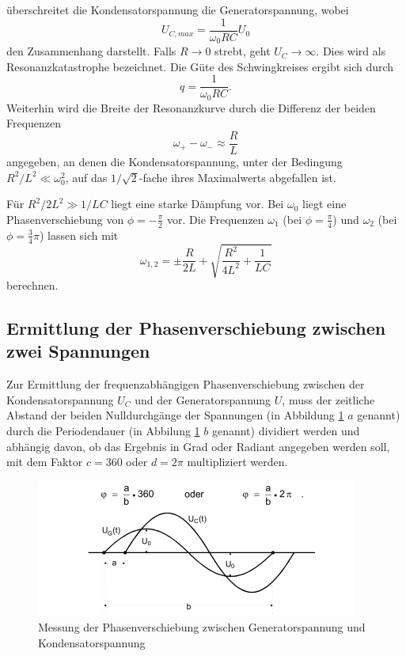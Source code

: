 \noindent 
überschreitet die Kondensatorspannung die Generatorspannung, wobei 
\begin{equation}
    U_{C,max} = \frac{1}{\omega_0 RC} U_0 
\end{equation}
\noindent
den Zusammenhang darstellt. Falls $R \rightarrow 0$ strebt, geht $U_C \rightarrow \infty$. Dies 
wird als Resonanzkatastrophe bezeichnet. Die Güte des Schwingkreises ergibt sich durch
\begin{equation}
    q = \frac{1}{\omega_0 RC}.
    \label{eq:b1}
\end{equation}
\noindent
Weiterhin wird die Breite der Resonanzkurve durch die Differenz der beiden Frequenzen 
\begin{equation}
    \omega_+ - \omega_- \approx \frac{R}{L}
\end{equation}
angegeben, an denen die Kondensatorspannung, unter der Bedingung 
$R^{2}/L^{2} \ll \omega_0^{2}$, auf das $1/\sqrt{2}$-fache
ihres Maximalwerts abgefallen ist.  

Für $R^{2}/2L^{2} \gg 1/LC$ liegt eine starke Dämpfung vor. Bei $\omega_0$ liegt
eine Phasenverschiebung von $\phi = -\frac{\pi}{2}$ vor. Die Frequenzen $\omega_1$ (bei $\phi = \frac{\pi}{4}$) und
$\omega_2$ (bei $\phi = \frac{3}{4}\pi$) lassen sich mit 
\begin{equation}
    \omega_{1,2} = \pm \frac{R}{2L} + \sqrt{\frac{R^{2}}{4L^{2}}+\frac{1}{LC}}
    \label{eq:bb}
\end{equation}
\noindent berechnen.


\subsection{Ermittlung der Phasenverschiebung zwischen zwei Spannungen}

Zur Ermittlung der frequenzabhängigen Phasenverschiebung zwischen der Kondensatorspannung $U_C$ 
und der Generatorspannung $U$, muss der zeitliche Abstand der beiden Nulldurchgänge der Spannungen 
(in Abbildung \ref{fig:phase} $a$ genannt) durch die Periodendauer (in Abbilung \ref{fig:phase} $b$ genannt)
dividiert werden und abhängig davon, ob das Ergebnis in Grad oder Radiant angegeben werden soll,
mit dem Faktor $c = 360$ oder $d = 2\pi$ multipliziert werden.


\begin{figure}[H]
  \centering
  \includegraphics{content/phase.png}
  \caption{Messung der Phasenverschiebung zwischen Generatorspannung und Kondensatorspannung \cite{sample354}}
  \label{fig:phase}
\end{figure}
